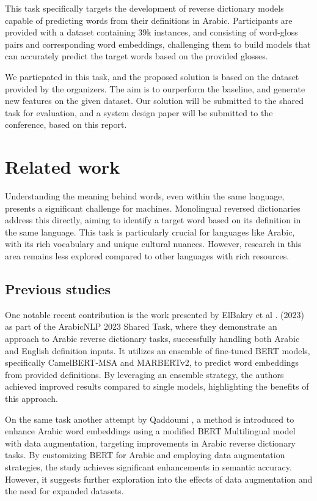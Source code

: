 \documentclass[12.5pt]{article}
\begin{document}
This task specifically targets the development of reverse dictionary models capable of predicting words from their definitions in Arabic. Participants are provided with a dataset containing 39k instances, and consisting of word-gloss pairs and corresponding word embeddings, challenging them to build models that can accurately predict the target words based on the provided glosses.

We particpated in this task, and the proposed solution is based on the dataset provided by the organizers. The aim is to ourperform the baseline, and generate new features on the given dataset. Our solution will be submitted to the shared task for evaluation, and a system design paper will be submitted to the conference, based on this report.

\newpage

\section{Related work}

Understanding the meaning behind words, even within the same language, presents a significant challenge for machines. Monolingual reversed dictionaries address this directly, aiming to identify a target word based on its definition in the same language. This task is particularly crucial for languages like Arabic, with its rich vocabulary and unique cultural nuances. However, research in this area remains less explored compared to other languages with rich resources.

\subsection{Previous studies}

One notable recent contribution is the work presented by ElBakry et al \cite{Albakry2023}. (2023) as part of the ArabicNLP 2023 Shared Task, where they demonstrate an approach to Arabic reverse dictionary tasks, successfully handling both Arabic and English definition inputs. It utilizes an ensemble of fine-tuned BERT models, specifically CamelBERT-MSA and MARBERTv2, to predict word embeddings from provided definitions. By leveraging an ensemble strategy, the authors achieved improved results compared to single models, highlighting the benefits of this approach.

On the same task another attempt by Qaddoumi \cite{Qaddoumi2023}, a method is introduced to enhance Arabic word embeddings using a modified BERT Multilingual model with data augmentation, targeting improvements in Arabic reverse dictionary tasks. By customizing BERT for Arabic and employing data augmentation strategies, the study achieves significant enhancements in semantic accuracy. However, it suggests further exploration into the effects of data augmentation and the need for expanded datasets.
\end{document}
